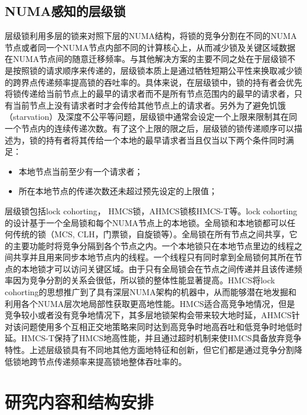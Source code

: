\subsection{NUMA感知的层级锁}
层级锁利用多层的锁来对照下层的NUMA结构，将锁的竞争分割在不同的NUMA节点或者同一个NUMA节点内部不同的计算核心上，从而减少锁及关键区域数据在NUMA节点间的随意迁移频率。与其他解决方案的主要不同之处在于层级锁不是按照锁的请求顺序来传递的，层级锁本质上是通过牺牲短期公平性来换取减少锁的跨界点传递频率提高锁的吞吐率的。具体来说，在层级锁中，锁的持有者会优先将锁传递给当前节点上的最早的请求者而不是所有节点范围内的最早的请求者，只有当前节点上没有请求者时才会传给其他节点上的请求者。另外为了避免饥饿（starvation）及深度不公平等问题，层级锁中通常会设定一个上限来限制其在同一个节点内的连续传递次数。有了这个上限的限之后，层级锁的锁传递顺序可以描述为，锁的持有者将其传给一个本地的最早请求者当且仅当以下两个条件同时满足：
\begin{itemize}
\item  本地节点当前至少有一个请求者；
\item  所在本地节点的传递次数还未超过预先设定的上限值；
\end{itemize}
层级锁包括lock cohorting， HMCS锁，AHMCS锁核HMCS-T等。lock cohorting的设计基于一个全局锁和每个NUMA节点上的本地锁。全局锁和本地锁都可以任何传统的锁（MCS, CLH，门票锁，自旋锁等）。全局锁在所有节点之间共享，它的主要功能时将竞争分隔到各个节点之内。一个本地锁只在本地节点里边的线程之间共享并且用来同步本地节点内的线程。一个线程只有同时拿到全局锁何其所在节点的本地锁才可以访问关键区域。由于只有全局锁会在节点之间传递并且该传递频率因为竞争分割的关系会很低，所以锁的整体性能显著提高。HMCS将lock cohorting的思想推广到了具有深层NUMA架构的机器中，从而能够潜在地发掘和利用各个NUMA层次地局部性获取更高地性能。HMCS适合高竞争地情况，但是竞争较小或者没有竞争地情况下，其多层地锁架构会带来较大地时延，AHMCS针对该问题使用多个互相正交地策略来同时达到高竞争时地高吞吐和低竞争时地低时延。HMCS-T保持了HMCS地高性能，并且通过超时机制来使HMCS具备放弃竞争特性。上述层级锁具有不同地其他方面地特征和创新，但它们都是通过竞争分割降低锁地跨节点传递频率来提高锁地整体吞吐率的。
\section{研究内容和结构安排}
